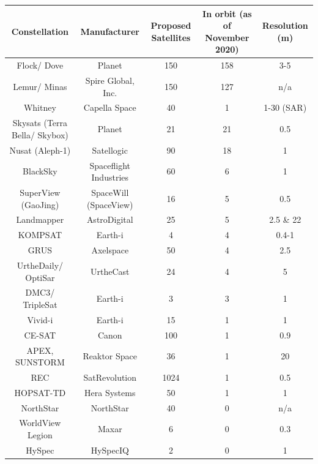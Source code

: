 \bigskip
\begin{center}
\vspace{3mm}
\begin{adjustbox}{width=0.9\textwidth}
\begin{tabular}{||c| c |c |c |c||}
\hline
\textbf{Constellation} & \textbf{Manufacturer} & \textbf{Proposed Satellites} & \textbf{In orbit} (as of November 2020) & \textbf{Resolution (m)}\\
\hline \hline
Flock/ Dove & Planet & 150 & 158 & 3-5\\%
Lemur/ Minas & Spire Global, Inc. & 150 & 127 & n/a\\
Whitney & Capella Space & 40 & 1 & 1-30 (SAR)\\
Skysats (Terra Bella/ Skybox) & Planet & 21 & 21 & 0.5\\
Nusat (Aleph-1) & Satellogic & 90 & 18 & 1\\ %
BlackSky & Spaceflight Industries & 60 & 6 & 1\\%
SuperView (GaoJing) & SpaceWill (SpaceView) & 16 & 5 & 0.5\\%
Landmapper & AstroDigital & 25 & 5 & 2.5 \& 22\\
KOMPSAT & Earth-i & 4 & 4 & 0.4-1\\
GRUS & Axelspace & 50 & 4 & 2.5\\
UrtheDaily/ OptiSar & UrtheCast & 24 & 4 & 5\\
DMC3/ TripleSat & Earth-i & 3 & 3 & 1\\
Vivid-i & Earth-i & 15 & 1 & 1\\
CE-SAT & Canon & 100 & 1 & 0.9\\%
APEX, SUNSTORM & Reaktor Space & 36 & 1 & 20\\%
REC & SatRevolution & 1024 & 1 & 0.5\\
HOPSAT-TD & Hera Systems & 50 & 1 & 1\\
NorthStar & NorthStar & 40 & 0 & n/a\\%
WorldView Legion & Maxar & 6 & 0 & 0.3\\%
HySpec & HySpecIQ & 2 & 0 & 1\\ %




\end{tabular}
\end{adjustbox}
\end{center}
